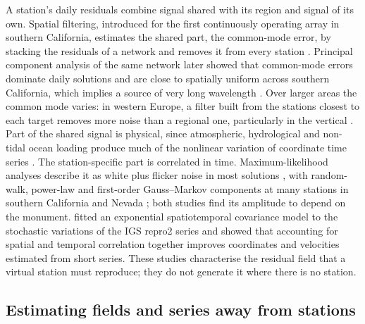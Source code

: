 \documentclass[preprint,12pt,authoryear]{elsarticle}
\begin{document}
A station's daily residuals combine signal shared with its region and signal of its own.
Spatial filtering, introduced for the first continuously operating array in southern
California, estimates the shared part, the common-mode error, by stacking the residuals
of a network and removes it from every station \citep{wdowinski1997}. Principal component
analysis of the same network later showed that common-mode errors dominate daily
solutions and are close to spatially uniform across southern California, which implies a
source of very long wavelength \citep{dong2006}. Over larger areas the common mode
varies: in western Europe, a filter built from the stations closest to each target
removes more noise than a regional one, particularly in the vertical \citep{kreemer2021}.
Part of the shared signal is physical, since atmospheric, hydrological and non-tidal
ocean loading produce much of the nonlinear variation of coordinate time series
\citep{li2025loading}. The station-specific part is correlated in time.
Maximum-likelihood analyses describe it as white plus flicker noise in most solutions
\citep{williams2004}, with random-walk, power-law and first-order Gauss--Markov
components at many stations in southern California and Nevada \citep{langbein2008}; both
studies find its amplitude to depend on the monument. \citet{benoist2020} fitted an
exponential spatiotemporal covariance model to the stochastic variations of the IGS
repro2 series and showed that accounting for spatial and temporal correlation together
improves coordinates and velocities estimated from short series. These studies
characterise the residual field that a virtual station must reproduce; they do not
generate it where there is no station.

\subsection{Estimating fields and series away from stations}
\end{document}
